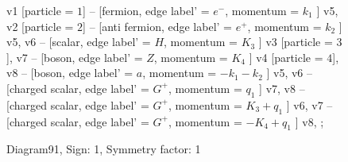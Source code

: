 \documentclass{revtex4}
\begin{document}
\begin{figure}[!htb]
\begin{center}
{    %
v1 [particle = \(1\)] -- [fermion, edge label' = \(e^{-}\), momentum = \(k_{1}\) ] v5, 
v2 [particle = \(2\)] -- [anti fermion, edge label' = \(e^{+}\), momentum = \(k_{2}\) ] v5, 
v6 -- [scalar, edge label' = \(H\), momentum = \(K_{3}\) ] v3 [particle = \(3\)], 
v7 -- [boson, edge label' = \(Z\), momentum = \(K_{4}\) ] v4 [particle = \(4\)], 
v8 -- [boson, edge label' = \(a\), momentum = \(-k_{1} - k_{2}\) ] v5, 
v6 -- [charged scalar, edge label' = \(G^{+}\), momentum = \(q_{1}\) ] v7, 
v8 -- [charged scalar, edge label' = \(G^{+}\), momentum = \(K_{3} + q_{1}\) ] v6, 
v7 -- [charged scalar, edge label' = \(G^{+}\), momentum = \(-K_{4} + q_{1}\) ] v8, 
};
\end{center}
\caption{Diagram91, Sign: 1, Symmetry factor: 1}
\end{figure}
\newpage
\end{document}
